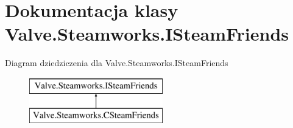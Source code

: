 \hypertarget{class_valve_1_1_steamworks_1_1_i_steam_friends}{}\section{Dokumentacja klasy Valve.\+Steamworks.\+I\+Steam\+Friends}
\label{class_valve_1_1_steamworks_1_1_i_steam_friends}
Diagram dziedziczenia dla Valve.\+Steamworks.\+I\+Steam\+Friends\begin{figure}[H]
\begin{center}
\leavevmode
\includegraphics[height=2.000000cm]{class_valve_1_1_steamworks_1_1_i_steam_friends}
\end{center}
\end{figure}
